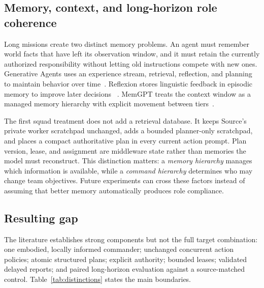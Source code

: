 \documentclass[11pt]{article}
\begin{document}
\subsection{Memory, context, and long-horizon role coherence}

Long missions create two distinct memory problems.  An agent must remember world
facts that have left its observation window, and it must retain the currently
authorized responsibility without letting old instructions compete with new ones.
Generative Agents uses an experience stream, retrieval, reflection, and planning
to maintain behavior over time~\citep{park2023generative}.  Reflexion stores
linguistic feedback in episodic memory to improve later decisions
~\citep{shinn2023reflexion}.  MemGPT treats the context window as a managed memory
hierarchy with explicit movement between tiers~\citep{packer2023memgpt}.

The first squad treatment does not add a retrieval database.  It keeps Source's
private worker scratchpad unchanged, adds a bounded planner-only scratchpad, and
places a compact authoritative plan in every current action prompt.  Plan version,
lease, and assignment are middleware state rather than memories the model must
reconstruct.  This distinction matters: a \emph{memory hierarchy} manages which
information is available, while a \emph{command hierarchy} determines who may
change team objectives.  Future experiments can cross these factors instead of
assuming that better memory automatically produces role compliance.

\subsection{Resulting gap}

The literature establishes strong components but not the full target combination:
one embodied, locally informed commander; unchanged concurrent action policies;
atomic structured plans; explicit authority; bounded leases; validated delayed
reports; and paired long-horizon evaluation against a source-matched control.
Table~\ref{tab:distinctions} states the main boundaries.
\end{document}
